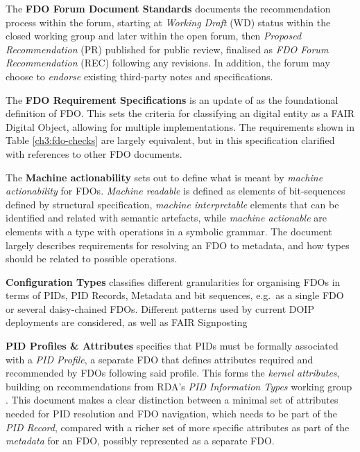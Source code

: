 The \textbf{FDO Forum Document Standards} \cite{fdo-DocProcessStd} documents the recommendation process within the forum, starting at \emph{Working Draft} (WD) status within the closed working group and later within the open forum, then \emph{Proposed Recommendation} (PR) published for public review, finalised as \emph{FDO Forum Recommendation} (REC) following any revisions. In addition, the forum may choose to \emph{endorse} existing third-party notes and specifications.

The \textbf{FDO Requirement Specifications} \cite{fdo-RequirementSpec} is an update of \cite{boninoFAIRDigitalObject} as the foundational definition of FDO. This sets the criteria for classifying an digital entity as a FAIR Digital Object, allowing for multiple implementations. The requirements shown in Table \vref{ch3:fdo-checks} are largely equivalent, but in this specification clarified with references to other FDO documents.

The \textbf{Machine actionability} \cite{fdo-MachineActionDef} sets out to define what is meant by \emph{machine actionability} for FDOs. \emph{Machine readable} is defined as elements of bit-sequences defined by structural specification, \emph{machine interpretable} elements that can be identified and related with semantic artefacts, while \emph{machine actionable} are elements with a type with operations in a symbolic grammar. The document largely describes requirements for resolving an FDO to metadata, and how types should be related to possible operations.

\textbf{Configuration Types} \cite{fdo-ConfigurationTypes} classifies different granularities for organising FDOs in terms of PIDs, PID Records, Metadata and bit sequences, e.g.~as a single FDO or several daisy-chained FDOs. Different patterns used by current DOIP deployments are considered, as well as FAIR Signposting \cite{vandesompelFAIRSignpostingProfile2022}

\textbf{PID Profiles \& Attributes} \cite{fdo-PIDProfileAttributes} specifies that PIDs must be formally associated with a \emph{PID Profile}, a separate FDO that defines attributes required and recommended by FDOs following said profile. This forms the \emph{kernel attributes}, building on recommendations from RDA's \emph{PID Information Types} working group \cite{weigelRDARecommendationPID2018}. This document makes a clear distinction between a minimal set of attributes needed for PID resolution and FDO navigation, which needs to be part of the \emph{PID Record}, compared with a richer set of more specific attributes as part of the \emph{metadata} for an FDO, possibly represented as a separate FDO.

